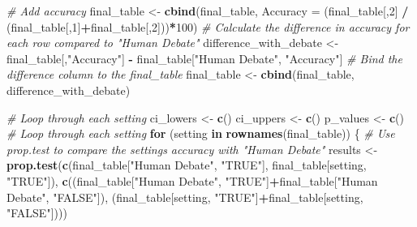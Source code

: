 \documentclass[
]{article}
\newenvironment{Shaded}{\begin{snugshade}}{\end{snugshade}}
\newcommand{\AttributeTok}[1]{\textcolor[rgb]{0.13,0.29,0.53}{#1}}
\newcommand{\CommentTok}[1]{\textcolor[rgb]{0.56,0.35,0.01}{\textit{#1}}}
\newcommand{\ControlFlowTok}[1]{\textcolor[rgb]{0.13,0.29,0.53}{\textbf{#1}}}
\newcommand{\DecValTok}[1]{\textcolor[rgb]{0.00,0.00,0.81}{#1}}
\newcommand{\FunctionTok}[1]{\textcolor[rgb]{0.13,0.29,0.53}{\textbf{#1}}}
\newcommand{\NormalTok}[1]{#1}
\newcommand{\OtherTok}[1]{\textcolor[rgb]{0.56,0.35,0.01}{#1}}
\newcommand{\SpecialCharTok}[1]{\textcolor[rgb]{0.81,0.36,0.00}{\textbf{#1}}}
\newcommand{\StringTok}[1]{\textcolor[rgb]{0.31,0.60,0.02}{#1}}
\begin{document}
\begin{Shaded}
\begin{Highlighting}[]
\CommentTok{\# Add accuracy}
\NormalTok{final\_table }\OtherTok{\textless{}{-}} \FunctionTok{cbind}\NormalTok{(final\_table, }\AttributeTok{Accuracy =}\NormalTok{ (final\_table[,}\DecValTok{2}\NormalTok{] }\SpecialCharTok{/}\NormalTok{ (final\_table[,}\DecValTok{1}\NormalTok{]}\SpecialCharTok{+}\NormalTok{final\_table[,}\DecValTok{2}\NormalTok{]))}\SpecialCharTok{*}\DecValTok{100}\NormalTok{)}
\CommentTok{\# Calculate the difference in accuracy for each row compared to "Human Debate"}
\NormalTok{difference\_with\_debate }\OtherTok{\textless{}{-}}\NormalTok{ final\_table[,}\StringTok{"Accuracy"}\NormalTok{] }\SpecialCharTok{{-}}\NormalTok{ final\_table[}\StringTok{"Human Debate"}\NormalTok{, }\StringTok{"Accuracy"}\NormalTok{]}
\CommentTok{\# Bind the difference column to the final\_table}
\NormalTok{final\_table }\OtherTok{\textless{}{-}} \FunctionTok{cbind}\NormalTok{(final\_table, difference\_with\_debate)}

\CommentTok{\# Loop through each setting}
\NormalTok{ci\_lowers }\OtherTok{\textless{}{-}} \FunctionTok{c}\NormalTok{()}
\NormalTok{ci\_uppers }\OtherTok{\textless{}{-}} \FunctionTok{c}\NormalTok{()}
\NormalTok{p\_values }\OtherTok{\textless{}{-}} \FunctionTok{c}\NormalTok{()}
\CommentTok{\# Loop through each setting}
\ControlFlowTok{for}\NormalTok{ (setting }\ControlFlowTok{in} \FunctionTok{rownames}\NormalTok{(final\_table)) \{}
  \CommentTok{\# Use prop.test to compare the setting\textquotesingle{}s accuracy with "Human Debate"}
\NormalTok{  results }\OtherTok{\textless{}{-}} \FunctionTok{prop.test}\NormalTok{(}\FunctionTok{c}\NormalTok{(final\_table[}\StringTok{"Human Debate"}\NormalTok{, }\StringTok{"TRUE"}\NormalTok{], final\_table[setting, }\StringTok{"TRUE"}\NormalTok{]), }\FunctionTok{c}\NormalTok{((final\_table[}\StringTok{"Human Debate"}\NormalTok{, }\StringTok{"TRUE"}\NormalTok{]}\SpecialCharTok{+}\NormalTok{final\_table[}\StringTok{"Human Debate"}\NormalTok{, }\StringTok{"FALSE"}\NormalTok{]), (final\_table[setting, }\StringTok{"TRUE"}\NormalTok{]}\SpecialCharTok{+}\NormalTok{final\_table[setting, }\StringTok{"FALSE"}\NormalTok{])))}
  

\end{Highlighting}
\end{Shaded}
\end{document}
